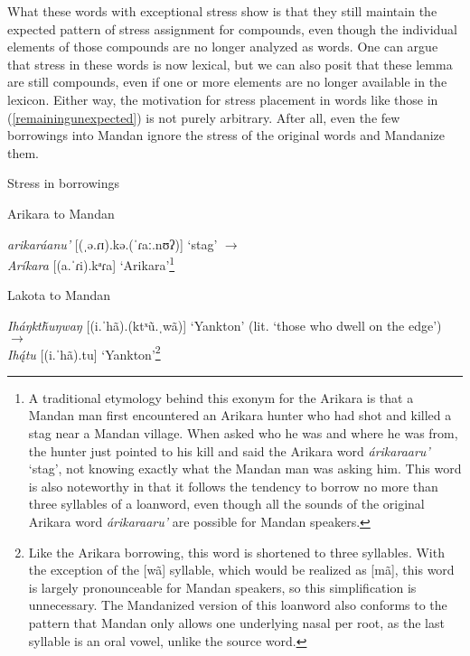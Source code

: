 What these words with exceptional stress show is that they still maintain the expected pattern of stress assignment for compounds, even though the individual elements of those compounds are no longer analyzed as words. One can argue that stress in these words is now lexical, but we can also posit that these lemma are still compounds, even if one or more elements are no longer available in the lexicon. Either way, the motivation for stress placement in words like those in (\ref{remainingunexpected}) is not purely arbitrary. After all, even the few borrowings into Mandan ignore the stress of the original words and Mandanize them.


\begin{exe}
\item\label{mandanborrowings} Stress in borrowings

\begin{xlist}

\item\label{mandanborrowings1} Arikara to Mandan \citep{parksdemallie2002}

\textit{arikaráanu'} [(ˌə.ɾɪ).kə.(ˈɾaː.nʊʔ)] `stag' $\to$\\
	\textit{Aríkara} [(a.ˈɾi).kᵃɾa] `Arikara'\footnote{A traditional etymology behind this exonym for the Arikara is that a Mandan man first encountered an Arikara hunter who had shot and killed a stag near a Mandan village. When asked who he was and where he was from, the hunter just pointed to his kill and said the Arikara word \textit{árikaraaru'} `stag', not knowing exactly what the Mandan man was asking him. This word is also noteworthy in that it follows the tendency to borrow no more than three syllables of a loanword, even though all the sounds of the original Arikara word \textit{árikaraaru'} are possible for Mandan speakers.}


\item\label{mandanborrowings2} Lakota to Mandan \citep[208]{ullrich2011}

\textit{Iháŋktȟuŋwaŋ} [(i.ˈhã).(ktˣũ.ˌwã)] `Yankton' (lit. `those who dwell on the edge') $\to$\\
	\textit{Ihą́tu} [(i.ˈhã).tu] `Yankton'\footnote{Like the Arikara borrowing, this word is shortened to three syllables. With the exception of the [wã] syllable, which would be realized as [mã], this word is largely pronounceable for Mandan speakers, so this simplification is unnecessary. The Mandanized version of this loanword also conforms to the pattern that Mandan only allows one underlying nasal per root, as the last syllable is an oral vowel, unlike the source word.}


\end{xlist}
\end{exe}

